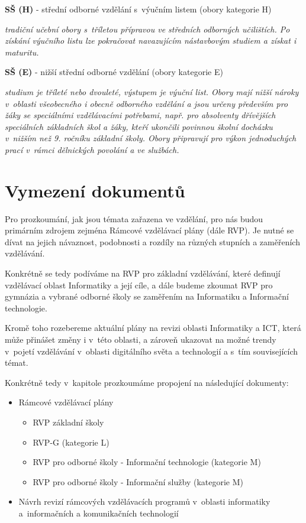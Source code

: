 \textbf{SŠ (H)} - střední odborné vzdělání s~výučním listem (obory kategorie H)

\textit{tradiční učební obory s~tříletou přípravou ve středních odborných učilištích. Po získání výučního listu lze pokračovat navazujícím nástavbovým studiem a získat i maturitu.}

\textbf{SŠ (E)} - nižší střední odborné vzdělání (obory kategorie E)

\textit{studium je tříleté nebo dvouleté, výstupem je výuční list. Obory mají nižší nároky v~oblasti všeobecného i obecně odborného vzdělání a jsou určeny především pro žáky se speciálními vzdělávacími potřebami, např. pro absolventy dřívějších speciálních základních škol a žáky, kteří ukončili povinnou školní docházku v~nižším než 9. ročníku základní školy. Obory připravují pro výkon jednoduchých prací v~rámci dělnických povolání a ve službách.}

\section{Vymezení dokumentů}

Pro prozkoumání, jak jsou témata zařazena ve vzdělání, pro nás budou primárním zdrojem zejména Rámcové vzdělávací plány (dále RVP). Je nutné se dívat na jejich návaznost, podobnosti a rozdíly na různých stupních a zaměřeních vzdělávání.

Konkrétně se tedy podíváme na RVP pro základní vzdělávání, které definují vzdělávací oblast Informatiky a její cíle, a dále budeme zkoumat RVP pro gymnázia a vybrané odborné školy se zaměřením na Informatiku a Informační technologie. 

Kromě toho rozebereme aktuální plány na revizi oblasti Informatiky a ICT, která může přinášet změny i v~této oblasti, a zároveň ukazovat na možné trendy v~pojetí vzdělávání v~oblasti digitálního světa a technologií a s~tím souvisejících témat.

Konkrétně tedy v~kapitole prozkoumáme propojení na následující dokumenty:

\begin{itemize}
\item Rámcové vzdělávací plány
	\begin{itemize}
    \item RVP základní školy \citep{rvp-zs}
    \item RVP-G (kategorie L) \citep{rvp-g}
    \item RVP pro odborné školy - Informační technologie \citep{rvp-it} (kategorie M)
    \item RVP pro odborné školy - Informační služby\citep{rvp-is} (kategorie M)
	\end{itemize}
\item Návrh revizí rámcových vzdělávacích programů v oblasti informatiky a informačních a komunikačních technologií \citep{revize}
\end{itemize}

